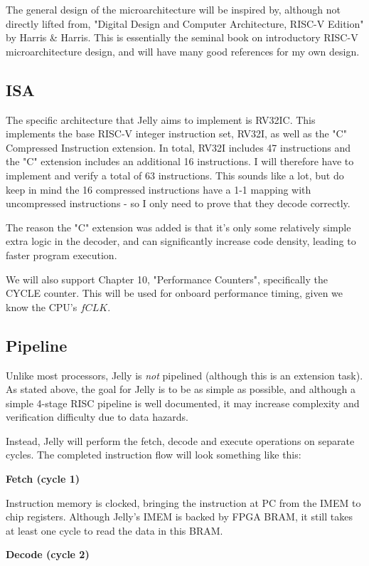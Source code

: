 \documentclass{article}
\begin{document}
The general design of the microarchitecture will be inspired by, although not directly lifted from, "Digital
Design and Computer Architecture, RISC-V Edition" by Harris \& Harris. This is essentially the seminal book
on introductory RISC-V microarchitecture design, and will have many good references for my own design.

\subsection{ISA}
The specific architecture that Jelly aims to implement is RV32IC. This implements the base RISC-V integer
instruction set, RV32I, as well as the "C" Compressed Instruction extension. In total, RV32I includes 47
instructions and the "C" extension includes an additional 16 instructions. I will therefore have to implement
and verify a total of 63 instructions. This sounds like a lot, but do keep in mind the 16 compressed
instructions have a 1-1 mapping with uncompressed instructions - so I only need to prove that they decode
correctly.

The reason the "C" extension was added is that it's only some relatively simple extra logic in the decoder,
and can significantly increase code density, leading to faster program execution.

We will also support Chapter 10, "Performance Counters", specifically the CYCLE counter. This will be used
for onboard performance timing, given we know the CPU's $fCLK$.

\subsection{Pipeline}
Unlike most processors, Jelly is \textit{not} pipelined (although this is an extension task). As stated
above, the goal for Jelly is to be as simple as possible, and although a simple 4-stage RISC pipeline is well
documented, it may increase complexity and verification difficulty due to data hazards.

Instead, Jelly will perform the fetch, decode and execute operations on separate cycles. The completed
instruction flow will look something like this:

\textbf{Fetch (cycle 1)}

Instruction memory is clocked, bringing the instruction at PC from the IMEM to chip registers. Although
Jelly's IMEM is backed by FPGA BRAM, it still takes at least one cycle to read the data in this BRAM.

\textbf{Decode (cycle 2)}
\end{document}
